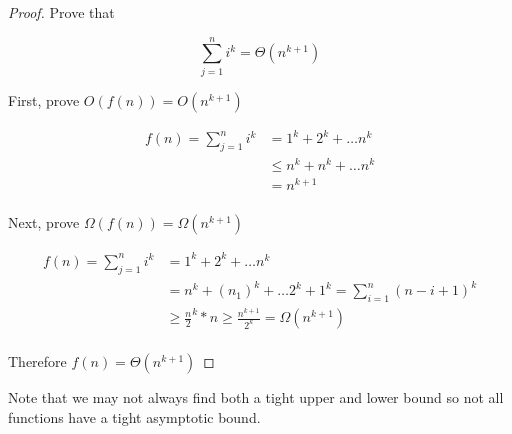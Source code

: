 \documentclass[10pt]{article}
\begin{document}
\begin{proof}
	Prove that 

	\begin{equation}
		\sum^n_{j=1} i^k = \Theta(n^{k+1})
	\end{equation}

	First, prove $ O(f(n)) = O(n^{k+1}) $ 

	\begin{equation}
		\begin{split}
			f(n) = \sum^n_{j=1} i^k &= 1^k + 2^k + \ldots n^k \\
			 &\le n^k + n^k + \ldots n^k  \\
			 &= n^{k+1} \\
		\end{split}
	\end{equation}


	Next, prove $ \Omega(f(n)) = \Omega(n^{k+1}) $ 

	\begin{equation}
		\begin{split}
			f(n) = \sum^n_{j=1} i^k &= 1^k + 2^k + \ldots n^k \\
			 &= n^k + (n_1)^k + \ldots 2^k + 1^k = \sum^n_{i=1} (n-i+1)^k \\
			 &\ge   \frac{n}{2}^k * n \ge \frac{n^{k+1}}{2^k} = \Omega(n^{k+1}) \\
		\end{split}
	\end{equation}

	Therefore $ f(n) = \Theta(n^{k+1}) $ 
\end{proof}

Note that we may not always find both a tight upper and lower bound so not all functions have a tight asymptotic bound.
\end{document}
